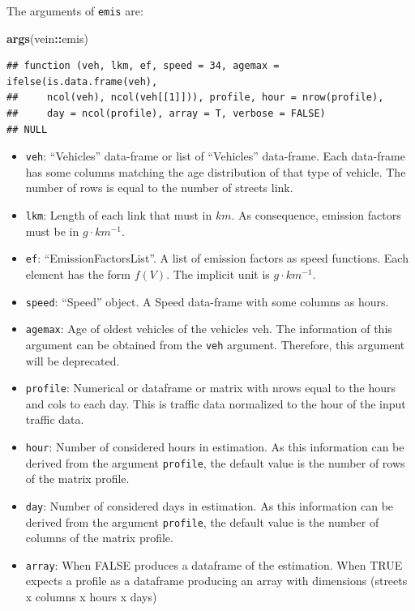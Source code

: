 \documentclass[12pt,graybox,envcountchap,sectrefs]{krantz}
\makeatletter
\newenvironment{Shaded}{\begin{snugshade}}{\end{snugshade}}
\newcommand{\KeywordTok}[1]{\textcolor[rgb]{0.13,0.29,0.53}{\textbf{#1}}}
\newcommand{\OperatorTok}[1]{\textcolor[rgb]{0.81,0.36,0.00}{\textbf{#1}}}
\newcommand{\NormalTok}[1]{#1}
\providecommand{\tightlist}{%
  \setlength{\itemsep}{0pt}\setlength{\parskip}{0pt}}
\newenvironment{kframe}{%
\medskip{}
\setlength{\fboxsep}{.8em}
 \def\at@end@of@kframe{}%
 \ifinner\ifhmode%
  \def\at@end@of@kframe{\end{minipage}}%
  \begin{minipage}{\columnwidth}%
 \fi\fi%
 \def\FrameCommand##1{\hskip\@totalleftmargin \hskip-\fboxsep
 \colorbox{shadecolor}{##1}\hskip-\fboxsep
     \hskip-\linewidth \hskip-\@totalleftmargin \hskip\columnwidth}%
 \MakeFramed {\advance\hsize-\width
   \@totalleftmargin\z@ \linewidth\hsize
   \@setminipage}}%
 {\par\unskip\endMakeFramed%
 \at@end@of@kframe}
\renewenvironment{Shaded}{\begin{kframe}}{\end{kframe}}
\theoremstyle{definition}
\theoremstyle{definition}
\theoremstyle{definition}
\theoremstyle{remark}
\makeatother
\begin{document}
The arguments of \texttt{emis} are:

\begin{Shaded}
\begin{Highlighting}[]
\KeywordTok{args}\NormalTok{(vein}\OperatorTok{::}\NormalTok{emis)}
\end{Highlighting}
\end{Shaded}

\begin{verbatim}
## function (veh, lkm, ef, speed = 34, agemax = ifelse(is.data.frame(veh), 
##     ncol(veh), ncol(veh[[1]])), profile, hour = nrow(profile), 
##     day = ncol(profile), array = T, verbose = FALSE) 
## NULL
\end{verbatim}

\begin{itemize}
\tightlist
\item
  \texttt{veh}: ``Vehicles'' data-frame or list of ``Vehicles''
  data-frame. Each data-frame has some columns matching the age
  distribution of that type of vehicle. The number of rows is equal to
  the number of streets link.
\item
  \texttt{lkm}: Length of each link that must in \(km\). As consequence,
  emission factors must be in \(g \cdot km^{-1}\).
\item
  \texttt{ef}: ``EmissionFactorsList''. A list of emission factors as
  speed functions. Each element has the form \(f(V)\). The implicit unit
  is \(g \cdot km^{-1}\).
\item
  \texttt{speed}: ``Speed'' object. A Speed data-frame with some columns
  as hours.
\item
  \texttt{agemax}: Age of oldest vehicles of the vehicles veh. The
  information of this argument can be obtained from the \texttt{veh}
  argument. Therefore, this argument will be deprecated.
\item
  \texttt{profile}: Numerical or dataframe or matrix with nrows equal to
  the hours and cols to each day. This is traffic data normalized to the
  hour of the input traffic data.
\item
  \texttt{hour}: Number of considered hours in estimation. As this
  information can be derived from the argument \texttt{profile}, the
  default value is the number of rows of the matrix profile.
\item
  \texttt{day}: Number of considered days in estimation. As this
  information can be derived from the argument \texttt{profile}, the
  default value is the number of columns of the matrix profile.
\item
  \texttt{array}: When FALSE produces a dataframe of the estimation.
  When TRUE expects a profile as a dataframe producing an array with
  dimensions (streets x columns x hours x days)
\end{itemize}
\end{document}
